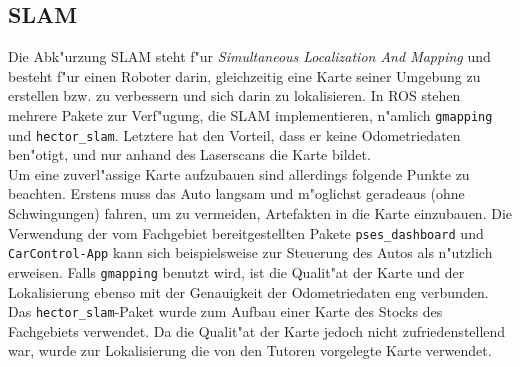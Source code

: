 \subsection{SLAM}
\label{subsec:02slam}

Die Abk"urzung SLAM steht f"ur \emph{Simultaneous Localization And Mapping} und besteht f"ur einen Roboter darin, gleichzeitig eine Karte seiner Umgebung zu erstellen bzw. zu verbessern und sich darin zu lokalisieren. In ROS stehen mehrere Pakete zur Verf"ugung, die SLAM implementieren, n"amlich \texttt{gmapping} und \texttt{hector\_slam}. Letztere hat den Vorteil, dass er keine Odometriedaten ben"otigt, und nur anhand des Laserscans die Karte bildet.\\
Um eine zuverl"assige Karte aufzubauen sind allerdings folgende Punkte zu beachten. Erstens muss das Auto langsam und m"oglichst geradeaus (ohne Schwingungen) fahren, um zu vermeiden, Artefakten in die Karte einzubauen. Die Verwendung der vom Fachgebiet bereitgestellten Pakete \texttt{pses\_dashboard} und \texttt{CarControl-App} kann sich beispielsweise zur Steuerung des Autos als n"utzlich erweisen. Falls \texttt{gmapping} benutzt wird, ist die Qualit"at der Karte und der Lokalisierung ebenso mit der Genauigkeit der Odometriedaten eng verbunden.\\
Das \texttt{hector\_slam}-Paket wurde zum Aufbau einer Karte des Stocks des Fachgebiets verwendet. Da die Qualit"at der Karte jedoch nicht zufriedenstellend war, wurde zur Lokalisierung die von den Tutoren vorgelegte Karte verwendet.